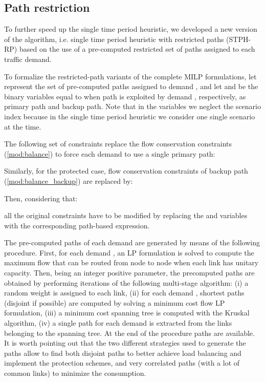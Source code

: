 \documentclass[final,5p,times,twocolumn]{elsarticle}
\begin{document}
\subsection{Path restriction}
To further speed up the single time period heuristic, we developed a new version of the algorithm, i.e. single time period heuristic with restricted paths (STPH-RP) based on the use of a pre-computed restricted set of paths assigned to each traffic demand.

To formalize the restricted-path variants of the complete MILP formulations, let  represent the set of pre-computed paths assigned to demand , and let  and  be the binary variables equal to  when path  is exploited by demand , respectively, as primary path and backup path. Note that in the variables we neglect the scenario index  because in the single time period heuristic we consider one single scenario at the time.

The following set of constraints replace the flow conservation constraints (\ref{mod:balance}) to force each demand to use a single primary path:



\noindent Similarly, for the protected case, flow conservation constraints of backup path (\ref{mod:balance_backup}) are replaced by:



\noindent Then, considering that:



\noindent all the original constraints have to be modified by replacing the  and  variables with the corresponding path-based expression.


The pre-computed paths of each demand are generated by means of the following procedure. First, for each demand , an LP formulation is solved to compute the maximum flow  that can be routed 
from node  to node  when each link has unitary capacity. Then, being  an integer positive parameter, the precomputed paths are obtained by performing  iterations of the following multi-stage algorithm: (i) a random weight is assigned to each link, (ii) for each demand ,  shortest paths (disjoint if possible) are computed by solving a minimum cost flow LP formulation, (iii) a minimum cost spanning tree is computed with the Kruskal algorithm, (iv) a single path for each demand is extracted from the links belonging to the spanning tree. At the end of the procedure  paths are available. It is worth pointing out that the two different strategies used to generate the paths allow to  find both disjoint paths to better achieve load balancing  and implement the protection schemes, and very correlated paths (with a lot of common links) to minimize the consumption.
\end{document}
